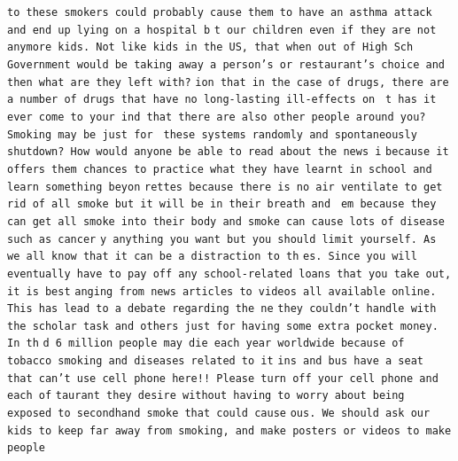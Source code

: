 \documentclass{article} %
\begin{document}
\texttt{\fontsize{.28cm}{.1cm}\selectfont \frenchspacing to these smokers could probably cause them to have an asthma attack and end up lying on a hospital b}
\texttt{\fontsize{.28cm}{.1cm}\selectfont \frenchspacing t our children even if they are not anymore kids. Not like kids in the US, that when out of High Sch}
\texttt{\fontsize{.28cm}{.1cm}\selectfont \frenchspacing  Government would be taking away a person's or restaurant's choice and then what are they left with?}
\texttt{\fontsize{.28cm}{.1cm}\selectfont \frenchspacing ion that in the case of drugs, there are a number of drugs that have no long-lasting ill-effects on }
\texttt{\fontsize{.28cm}{.1cm}\selectfont \frenchspacing t has it ever come to your ind that there are also other people around you? Smoking may be just for }
\texttt{\fontsize{.28cm}{.1cm}\selectfont \frenchspacing these systems randomly and spontaneously shutdown? How would anyone be able to read about the news i}
\texttt{\fontsize{.28cm}{.1cm}\selectfont \frenchspacing because it offers them chances to practice what they have learnt in school and learn something beyon}
\texttt{\fontsize{.28cm}{.1cm}\selectfont \frenchspacing rettes because there is no air ventilate to get rid of all smoke but it will be in their breath and }
\texttt{\fontsize{.28cm}{.1cm}\selectfont \frenchspacing em because they can get all smoke into their body and smoke can cause lots of disease such as cancer}
\texttt{\fontsize{.28cm}{.1cm}\selectfont \frenchspacing y anything you want but you should limit yourself. As we all know that it can be a distraction to th}
\texttt{\fontsize{.28cm}{.1cm}\selectfont \frenchspacing es. Since you will eventually have to pay off any school-related loans that you take out, it is best}
\texttt{\fontsize{.28cm}{.1cm}\selectfont \frenchspacing anging from news articles to videos all available online. This has lead to a debate regarding the ne}
\texttt{\fontsize{.28cm}{.1cm}\selectfont \frenchspacing they couldn't handle with the scholar task and others just for having some extra pocket money. In th}
\texttt{\fontsize{.28cm}{.1cm}\selectfont \frenchspacing d 6 million people may die each year worldwide because of tobacco smoking and diseases related to it}
\texttt{\fontsize{.28cm}{.1cm}\selectfont \frenchspacing ins and bus have a seat that can't use cell phone here!! Please turn off your cell phone and each of}
\texttt{\fontsize{.28cm}{.1cm}\selectfont \frenchspacing taurant they desire without having to worry about being exposed to secondhand smoke that could cause}
\texttt{\fontsize{.28cm}{.1cm}\selectfont \frenchspacing ous. We should ask our kids to keep far away from smoking, and make posters or videos to make people}
\end{document}
